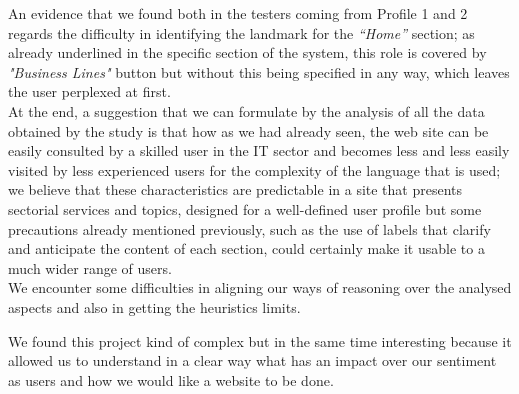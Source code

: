 An evidence that we found both in the testers coming from Profile 1 and 2 regards the difficulty in identifying the landmark for the \textit{“Home”} section; as already underlined in the specific section of the system, this role is covered by \textit{"Business Lines"} button but without this being specified in any way, which leaves the user perplexed at first.\\
At the end, a suggestion that we can formulate by the analysis of all the data obtained by the study is that how as we had already seen, the web site can be easily consulted by a skilled user in the IT sector and becomes less and less easily visited by less experienced users for the complexity of the language that is used; we believe that these characteristics are predictable in a site that presents sectorial services and topics, designed for a well-defined user profile but some precautions already mentioned previously, such as the use of labels that clarify and anticipate the content of each section, could certainly make it usable to a much wider range of users.\\
We encounter some difficulties in aligning our ways of reasoning over the analysed aspects and also in getting the heuristics limits.\par 
We found this project kind of complex but in the same time interesting because it allowed us to understand in a clear way what has an impact over our sentiment as users and how we would like a website to be done.
